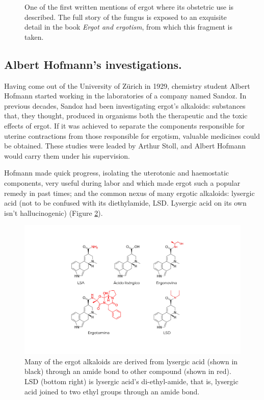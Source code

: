 \begin{figure}[H]
	\caption{One of the first written mentions of ergot where its obstetric use is described. The full story of the fungus is exposed to an exquisite detail in the book \textit{Ergot and ergotism}, from which this fragment is taken.}
	\label{ergotbook}
\end{figure}

\subsection{Albert Hofmann's investigations.}

Having come out of the University of Zürich in 1929, chemistry student Albert Hofmann started working in the laboratories of a company named Sandoz. In previous decades, Sandoz had been investigating ergot's alkaloids: substances that, they thought, produced in organisms both the therapeutic and the toxic effects of ergot. If it was achieved to separate the components responsible for uterine contractions from those responsible for ergotism, valuable medicines could be obtained. These studies were leaded by Arthur Stoll, and Albert Hofmann would carry them under his supervision. 

Hofmann made quick progress, isolating the uterotonic and haemostatic components, very useful during labor and which made ergot such a popular remedy in past times; and the common nexus of many ergotic alkaloids: lysergic acid (not to be confused with its diethylamide, LSD. Lysergic acid on its own isn't hallucinogenic) (Figure \ref{alkaloids}).

\begin{figure}[H]
	\centering
	\includegraphics[width=\linewidth]{media/2-alkaloids.png}
	\caption{Many of the ergot alkaloids are derived from lysergic acid (shown in black) through an amide bond to other compound (shown in red). LSD (bottom right) is lysergic acid's di-ethyl-amide, that is, lysergic acid joined to two ethyl groups through an amide bond.}
	\label{alkaloids}
\end{figure}

